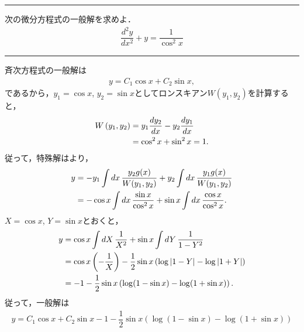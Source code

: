 \newpage
\hrule
\reidai
次の微分方程式の一般解を求めよ．
\begin{align}
  \dfrac{d^2y}{dx^2} + y = \dfrac{1}{\cos^{2}x} 
\end{align}
\hrule
\vspace*{.2cm}

斉次方程式の一般解は
\begin{align}
  y = C_1 \cos x + C_2 \sin x, 
\end{align}
であるから，$y_1 = \cos x$, $y_2=\sin x$としてロンスキアン$W(y_1, y_2)$を計算すると，
\begin{align}
  W\left(y_1, y_2\right) &= y_1 \dfrac{dy_2}{dx} - y_2 \dfrac{dy_1}{dx} \notag \\
                         &= \cos^{2}x + \sin^{2}x = 1. 
\end{align}
従って，特殊解はより，
\begin{align}
 y &= -y_1\int dx\,\dfrac{y_2 g(x)}{W(y_1,y_2)} + y_2\int dx\,\dfrac{y_1 g(x)}{W(y_1,y_2)} \notag \\
   &= -\cos x \int dx\, \dfrac{\sin x}{\cos^2 x} + \sin x \int dx\, \dfrac{\cos x}{\cos^2 x}.
\end{align}
$X=\cos x$, $Y=\sin x$とおくと，
\begin{align}
 y &= \cos x \int dX\, \dfrac{1}{X^2} + \sin x \int dY\,\dfrac{1}{1-Y^2} \notag \\
   &= \cos x \left(-\dfrac{1}{X}\right) - \dfrac{1}{2} \sin x \left( \log \left|1-Y\right| - \log \left|1+Y\right|\right) \notag \\
   &= -1 - \dfrac{1}{2}\sin x \left(\log(1-\sin x) - \log (1+\sin x)\right).
\end{align}
従って，一般解は
\begin{align}
  y = C_1 \cos x + C_2 \sin x -1 -\dfrac{1}{2}\sin x\left(\log (1-\sin x) - \log (1+\sin x)\right) 
\end{align}
